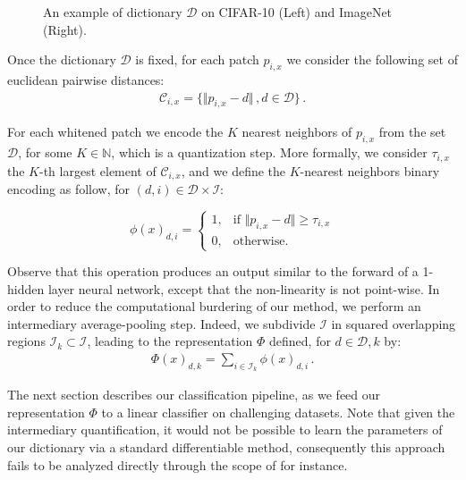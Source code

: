 \documentclass{article}
\begin{document}
{\begin{figure}
  \centering
  \fbox{\rule[-.5cm]{0cm}{4cm} \rule[-.5cm]{4cm}{0cm}}
  \caption{An example of dictionary $\mathcal{D}$ on CIFAR-10 (Left) and ImageNet (Right).\label{dico}}
\end{figure}

Once the dictionary $\mathcal{D}$ is fixed, for each patch $p_{i,x}$ we consider the following set of euclidean pairwise distances:
\begin{align*}\mathcal{C}_{i, x} =\{\Vert p_{i, x} - d \Vert\,, d\in\mathcal{D} \}\,.\end{align*}
 
For each whitened patch we encode the $K$ nearest neighbors of $p_{i,x}$ from the set $\mathcal{D}$, for some $ K \in \mathbb{N}$, which is a quantization step.
More formally, we consider $\tau_{i,x}$ the $K$-th largest element of $\mathcal{C}_{i,x}$, and we define the $K$-nearest neighbors binary encoding as follow, for $(d,i)\in\mathcal{D}\times\mathcal{I}$:


\begin{equation}
\phi(x)_{d,i}=
\begin{cases}
1,&\text{if } \Vert  p_{i,x} - d\Vert \geq \tau_{i,x}\\
0,&\text{otherwise}.
\end{cases}
\end{equation}






Observe that this operation produces an output similar to the forward of a 1-hidden layer neural network, except that the non-linearity is not point-wise. In order to reduce the computational burdering of our method, we perform an intermediary average-pooling step.
Indeed, we subdivide $\mathcal{I}$ in squared overlapping regions $\mathcal{I}_k\subset\mathcal{I}$, leading to the representation $\Phi$ defined, for $d\in\mathcal{D}, k$ by:
\begin{align*}\Phi(x)_{d,k}= \sum_{i\in \mathcal{I}_k}\phi(x)_{d,i}\,.\end{align*}

The next section describes our classification pipeline, as we feed our representation $\Phi$ to a linear classifier on challenging datasets. Note that given the intermediary quantification, it would not be possible to learn the parameters of our dictionary via a standard differentiable method, consequently this approach fails to be analyzed directly through the scope of \cite{chizat2018global} for instance.




}
\end{document}
